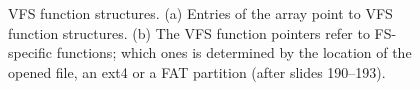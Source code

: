 \begin{figure}[H]
\caption{VFS function structures. (a) Entries of the  array point to VFS function structures. (b) The VFS function pointers refer to FS-specific functions; which ones is determined by the location of the opened file, an ext4 or a FAT partition (after slides 190--193).}
\label{fig:vfsptr}
\end{figure}

